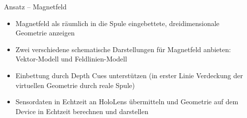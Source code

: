 \begin{frame}[fragile]{Ansatz -- Magnetfeld}
\begin{itemize}
\item Magnetfeld als räumlich in die Spule eingebettete, dreidimensionale Geometrie anzeigen
\item Zwei verschiedene schematische Darstellungen für Magnetfeld anbieten: Vektor-Modell und Feldlinien-Modell
\item Einbettung durch Depth Cues unterstützen (in erster Linie Verdeckung der virtuellen Geometrie durch reale Spule)
\item Sensordaten in Echtzeit an HoloLens übermitteln und Geometrie auf dem Device in Echtzeit berechnen und darstellen
\end{itemize}
\end{frame}

